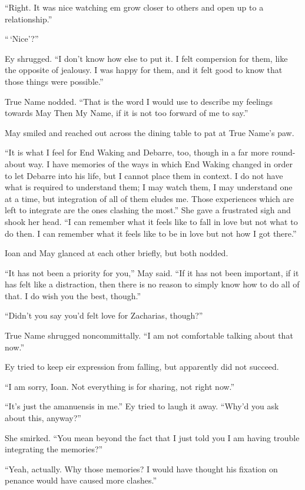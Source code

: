 ``Right. It was nice watching em grow closer to others and open up to a relationship.''

``\,`Nice'?''

Ey shrugged. ``I don't know how else to put it. I felt compersion for them, like the opposite of jealousy. I was happy for them, and it felt good to know that those things were possible.''

True Name nodded. ``That is the word I would use to describe my feelings towards May Then My Name, if it is not too forward of me to say.''

May smiled and reached out across the dining table to pat at True Name's paw.

``It is what I feel for End Waking and Debarre, too, though in a far more round-about way. I have memories of the ways in which End Waking changed in order to let Debarre into his life, but I cannot place them in context. I do not have what is required to understand them; I may watch them, I may understand one at a time, but integration of all of them eludes me. Those experiences which are left to integrate are the ones clashing the most.'' She gave a frustrated sigh and shook her head. ``I can remember what it feels like to fall in love but not what to do then. I can remember what it feels like to be in love but not how I got there.''

Ioan and May glanced at each other briefly, but both nodded.

``It has not been a priority for you,'' May said. ``If it has not been important, if it has felt like a distraction, then there is no reason to simply know how to do all of that. I do wish you the best, though.''

``Didn't you say you'd felt love for Zacharias, though?''

True Name shrugged noncommittally. ``I am not comfortable talking about that now.''

Ey tried to keep eir expression from falling, but apparently did not succeed.

``I am sorry, Ioan. Not everything is for sharing, not right now.''

``It's just the amanuensis in me.'' Ey tried to laugh it away. ``Why'd you ask about this, anyway?''

She smirked. ``You mean beyond the fact that I just told you I am having trouble integrating the memories?''

``Yeah, actually. Why those memories? I would have thought his fixation on penance would have caused more clashes.''

